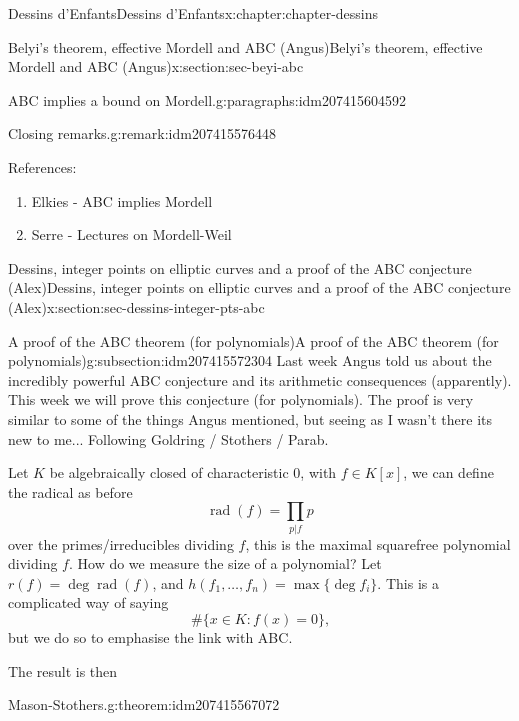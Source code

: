 \documentclass[oneside,10pt,]{book}
\numberwithin{equation}{section}
\newcommand{\lb}{[}
\newcommand{\rb}{]}
\begin{document}
\begin{chapterptx}{Dessins d'Enfants}{}{Dessins d'Enfants}{}{}{x:chapter:chapter-dessins}
\begin{sectionptx}{Belyi's theorem, effective Mordell and ABC (Angus)}{}{Belyi's theorem, effective Mordell and ABC (Angus)}{}{}{x:section:sec-beyi-abc}
\begin{paragraphs}{ABC implies a bound on Mordell.}{g:paragraphs:idm207415604592}
\begin{remark}{Closing remarks.}{g:remark:idm207415576448}
\end{remark}
References:%
\begin{enumerate}
\item{}Elkies - ABC implies Mordell%
\item{}Serre - Lectures on Mordell-Weil%
\end{enumerate}
%
\end{paragraphs}%
\end{sectionptx}
%
%
\typeout{************************************************}
\typeout{************************************************}
%
\begin{sectionptx}{Dessins, integer points on elliptic curves and a proof of the ABC conjecture (Alex)}{}{Dessins, integer points on elliptic curves and a proof of the ABC conjecture (Alex)}{}{}{x:section:sec-dessins-integer-pts-abc}
%
%
\typeout{************************************************}
\typeout{************************************************}
%
\begin{subsectionptx}{A proof of the ABC theorem (for polynomials)}{}{A proof of the ABC theorem (for polynomials)}{}{}{g:subsection:idm207415572304}
Last week Angus told us about the incredibly powerful ABC conjecture and its arithmetic consequences (apparently). This week we will prove this conjecture (for polynomials). The proof is very similar to some of the things Angus mentioned, but seeing as I wasn't there its new to me... Following Goldring \slash{} Stothers \slash{} Parab.%
\par
Let \(K\) be algebraically closed of characteristic 0, with \(f \in K\lb x \rb\), we can define the radical as before%
\begin{equation*}
\operatorname{rad}(f) = \prod_{p | f} p
\end{equation*}
over the primes\slash{}irreducibles dividing \(f\), this is the maximal squarefree polynomial dividing \(f\). How do we measure the size of a polynomial? Let \(r(f) = \deg \operatorname{rad}(f)\), and \(h(f_1, \ldots, f_n) = \max\{\deg f_i\}\). This is a complicated way of saying%
\begin{equation*}
\#\{x \in K : f(x) = 0 \}\text{,}
\end{equation*}
but we do so to emphasise the link with ABC.%
\par
The result is then%
\begin{theorem}{Mason-Stothers.}{}{g:theorem:idm207415567072}%

\end{theorem}
\end{subsectionptx}
\end{sectionptx}
\end{chapterptx}
\end{document}
